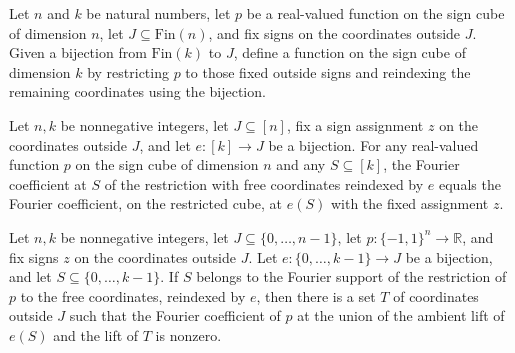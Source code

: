 \begin{definition}
\label{FABL.reindexedRestriction}
\leanok
{}
Let $n$ and $k$ be natural numbers, let $p$ be a real-valued function on the sign cube
of dimension $n$, let $J\subseteq\mathrm{Fin}(n)$, and fix signs on the coordinates
outside $J$. Given a bijection from $\mathrm{Fin}(k)$ to $J$, define a function on the
sign cube of dimension $k$ by restricting $p$ to those fixed outside signs and
reindexing the remaining coordinates using the bijection.
\end{definition}

\begin{theorem}
\label{FABL.fourierCoeff_reindexedRestriction}
\leanok
{}
Let $n,k$ be nonnegative integers, let $J\subseteq[n]$, fix a sign assignment $z$ on the
coordinates outside $J$, and let $e:[k]\to J$ be a bijection. For any real-valued
function $p$ on the sign cube of dimension $n$ and any $S\subseteq[k]$, the Fourier
coefficient at $S$ of the restriction with free coordinates reindexed by $e$ equals the
Fourier coefficient, on the restricted cube, at $e(S)$ with the fixed assignment $z$.
\end{theorem}

\begin{theorem}
\label{FABL.exists_ambientFrequency_of_reindexedRestriction_memSupport}
\leanok
{}
Let $n,k$ be nonnegative integers, let $J\subseteq\{0,\ldots,n-1\}$, let $p:\{
-1,1\}^n\to\mathbb R$, and fix signs $z$ on the coordinates outside $J$. Let
$e:\{0,\ldots,k-1\}\to J$ be a bijection, and let $S\subseteq\{0,\ldots,k-1\}$. If $S$
belongs to the Fourier support of the restriction of $p$ to the free coordinates,
reindexed by $e$, then there is a set $T$ of coordinates outside $J$ such that the
Fourier coefficient of $p$ at the union of the ambient lift of $e(S)$ and the lift of
$T$ is nonzero.
\end{theorem}

